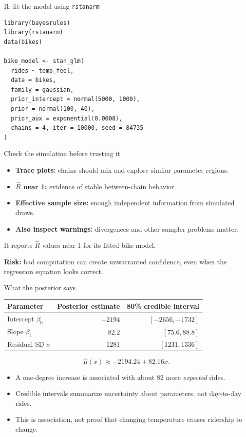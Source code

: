 \documentclass[aspectratio=43,11pt]{beamer}
\begin{document}
\begin{frame}[fragile]{R: fit the model using \texttt{rstanarm}}
\footnotesize
\begin{verbatim}
library(bayesrules)
library(rstanarm)
data(bikes)

bike_model <- stan_glm(
  rides ~ temp_feel,
  data = bikes,
  family = gaussian,
  prior_intercept = normal(5000, 1000),
  prior = normal(100, 40),
  prior_aux = exponential(0.0008),
  chains = 4, iter = 10000, seed = 84735
)
\end{verbatim}
\end{frame}

\begin{frame}{Check the simulation before trusting it}
\begin{itemize}
\item \textbf{Trace plots:} chains should mix and explore similar parameter regions.
\item \textbf{$\widehat R$ near 1:} evidence of stable between-chain behavior.
\item \textbf{Effective sample size:} enough independent information from simulated draws.
\item \textbf{Also inspect warnings:} divergences and other sampler problems matter.
\end{itemize}
It reports $\widehat R$ values near 1 for its fitted bike model.
\par\medskip\textbf{Risk:} bad computation can create unwarranted confidence, even when the regression equation looks correct.
\end{frame}

\begin{frame}{What the posterior says}
\centering\small
\begin{tabular}{lrr}
\toprule Parameter & Posterior estimate & 80\% credible interval\\\midrule
Intercept $\beta_0$ & $-2194$ & $[-2656,-1732]$\\
Slope $\beta_1$ & $82.2$ & $[75.6,88.8]$\\
Residual SD $\sigma$ & $1281$ & $[1231,1336]$\\\bottomrule
\end{tabular}

\[\widehat\mu(x)\approx -2194.24+82.16x.\]

\begin{itemize}
\item A one-degree increase is associated with about 82 more \emph{expected} rides.
\item Credible intervals summarize uncertainty about parameters, not day-to-day rides.
\item This is association, not proof that changing temperature causes ridership to change.
\end{itemize}
\end{frame}
\end{document}
